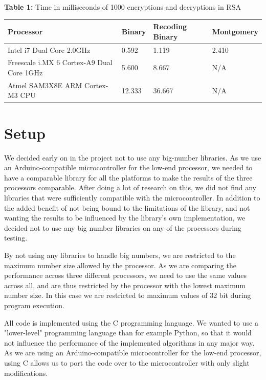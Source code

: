 \documentclass[twocolumn]{IEEEtran}
\begin{document}
\begin{table}[!htb] 
\textbf{Table 1:} Time in milliseconds of 1000 encryptions and decryptions in RSA \\[1em]
    \centering
    \begin{tabular}{|l|l|l|l|}
    \hline
    {\bf Processor}                                 & {\bf Binary}   & {\bf Recoding Binary} & {\bf Montgomery} \\ \hline
    Intel i7 Dual Core 2.0GHz                 & 0.592 & 1.119        & 2.410   \\ \hline
    Freescale i.MX 6 Cortex-A9 Dual Core 1GHz & 5.600 & 8.667        & N/A       \\ \hline
    Atmel SAM3X8E ARM Cortex-M3 CPU           & 12.333 & 36.667        & N/A       \\ \hline
    \end{tabular}
\end{table}

\section{Setup}
We decided early on in the project not to use any big-number libraries. As we use an Arduino-compatible microcontroller for the low-end processor, we needed to have a comparable library for all the platforms to make the results of the three processors comparable. After doing a lot of research on this, we did not find any libraries that were sufficiently compatible with the microcontroller. In addition to the added benefit of not being bound to the limitations of the library, and not wanting the results to be influenced by the library's own implementation, we decided not to use any big number libraries on any of the processors during testing.

By not using any libraries to handle big numbers, we are restricted to the maximum number size allowed by the processor. As we are comparing the performance across three different processors, we need to use the same values across all, and are thus restricted by the processor with the lowest maximum number size. In this case we are restricted to maximum values of 32 bit during program execution.

All code is implemented using the C programming language.  We wanted to use a "lower-level" programming language than for example Python, so that it would not influence the performance of the implemented algorithms in any major way. As we are using an Arduino-compatible microcontroller for the low-end processor, using C allows us to port the code over to the microcontroller with only slight modifications.
\end{document}
